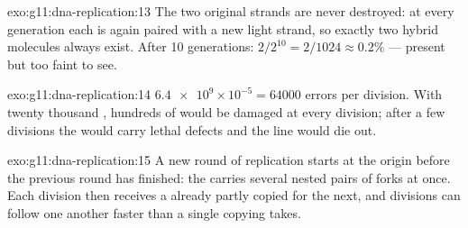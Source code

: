 \begin{solution}{exo:g11:dna-replication:13}
The two original strands are never destroyed: at every generation each
is again paired with a new light strand, so exactly two hybrid
molecules always exist. After 10 generations: $2/2^{10} = 2/1024
\approx 0.2\%$ --- present but too faint to see.
\end{solution}

\begin{solution}{exo:g11:dna-replication:14}
$\num{6.4e9} \times 10^{-5} = \num{64000}$ errors per division. With
twenty thousand , hundreds of  would be damaged at every
division; after a few divisions the  would carry lethal defects
and the line would die out.
\end{solution}

\begin{solution}{exo:g11:dna-replication:15}
A new round of replication starts at the origin before the previous
round has finished: the  carries several nested pairs of
forks at once. Each division then receives a  already partly
copied for the next, and divisions can follow one another faster than
a single copying takes.
\end{solution}

